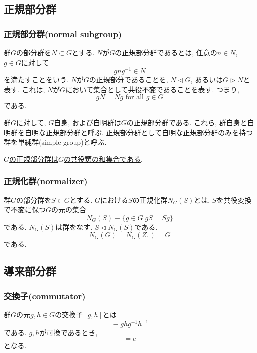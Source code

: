 \documentclass[11pt, a4paper]{jsarticle}
\begin{document}
\subsection{正規部分群}
\subsubsection{正規部分群(normal subgroup)}
群$G$の部分群を$N \subset G$とする.
$N$が$G$の正規部分群であるとは, 任意の$n \in N$, $g \in G$に対して
\begin{equation}
	g n g^{-1} \in N
\end{equation}
を満たすことをいう.
$N$が$G$の正規部分であることを, $N \triangleleft G$, あるいは$G \triangleright N$と表す.
これは, $N$が$G$において集合として共役不変であることを表す.
つまり,
\begin{equation}
	gN = Ng \text{ for all } g \in G
\end{equation}
である.

群$G$に対して, $G$自身, および自明群は$G$の正規部分群である.
これら, 群自身と自明群を自明な正規部分群と呼ぶ.
正規部分群として自明な正規部分群のみを持つ群を単純群(simple group)と呼ぶ.

\uline{$G$の正規部分群は$G$の共役類の和集合である}.

\subsubsection{正規化群(normalizer)}
群$G$の部分群を$S \in G$とする.
$G$における$S$の正規化群$N_G(S)$とは, $S$を共役変換で不変に保つ$G$の元の集合
\begin{equation}
	N_G(S) \equiv \{ g \in G | gS = Sg \}
\end{equation}
である.
$N_G(S)$は群をなす.
$S \triangleleft N_G(S)$である.
\begin{equation}
	N_G(G) = N_G(Z_1) = G
\end{equation}
である.

\subsection{導来部分群}
\subsubsection{交換子(commutator)}
群$G$の元$g,h \in G$の交換子$[g,h]$とは
\begin{equation}
	[g, h] \equiv g h g^{-1} h^{-1}
\end{equation}
である.
$g,h$が可換であるとき, 
\begin{equation}
	[g, h] = e
\end{equation}
となる.
\end{document}
